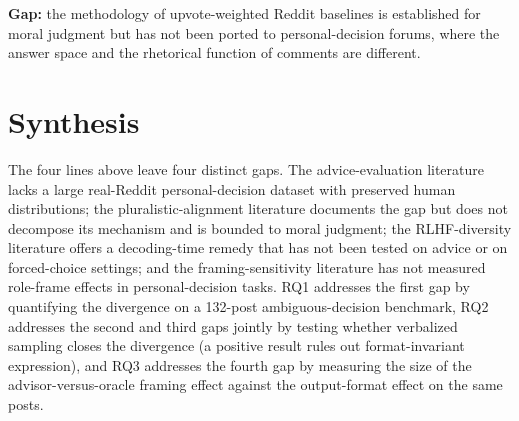 \textbf{Gap:} the methodology of upvote-weighted Reddit baselines is
established for moral judgment but has not been ported to
personal-decision forums, where the answer space and the rhetorical
function of comments are different.

\section{Synthesis}
\label{sec:synthesis}

The four lines above leave four distinct gaps. The advice-evaluation
literature lacks a large real-Reddit personal-decision dataset with
preserved human distributions; the pluralistic-alignment literature
documents the gap but does not decompose its mechanism and is
bounded to moral judgment; the RLHF-diversity literature offers a
decoding-time remedy that has not been tested on advice or on
forced-choice settings; and the framing-sensitivity literature has
not measured role-frame effects in personal-decision tasks. RQ1
addresses the first gap by quantifying the divergence on a 132-post
ambiguous-decision benchmark, RQ2 addresses the second and third
gaps jointly by testing whether verbalized sampling closes the
divergence (a positive result rules out format-invariant expression),
and
RQ3 addresses the fourth gap by measuring the size of the
advisor-versus-oracle framing effect against the output-format
effect on the same posts.
